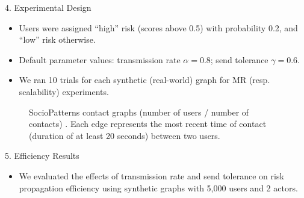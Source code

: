 \documentclass[final]{beamer}
\newlength{\colwidth}
\begin{document}
\begin{frame}[t]
\begin{columns}[t]
\begin{column}{\colwidth}
\begin{block}{4. Experimental Design}
\begin{itemize}
			\item Users were assigned ``high'' risk (scores above 0.5) with probability 0.2, and ``low'' risk otherwise.
			\item Default parameter values: transmission rate $\alpha = 0.8$; send tolerance $\gamma = 0.6$.
			\item We ran 10 trials for each synthetic (real-world) graph for MR (resp. scalability) experiments.
		\end{itemize}
	    \begin{figure}
	    	\centering
	    	 \qquad
			 \qquad
			\caption{SocioPatterns contact graphs (number of users / number of contacts) \cite{Genois2018}. Each edge represents the most recent time of contact (duration of at least 20 seconds) between two users.}
			\label{fig:sociopatterns}
		\end{figure}
	\end{block}
	\begin{block}{5. Efficiency Results}
		\begin{itemize}
			\item We evaluated the effects of transmission rate and send tolerance on risk propagation efficiency using synthetic graphs with 5,000 users and 2 actors.

\end{itemize}
\end{block}
\end{column}
\end{columns}
\end{frame}
\end{document}
